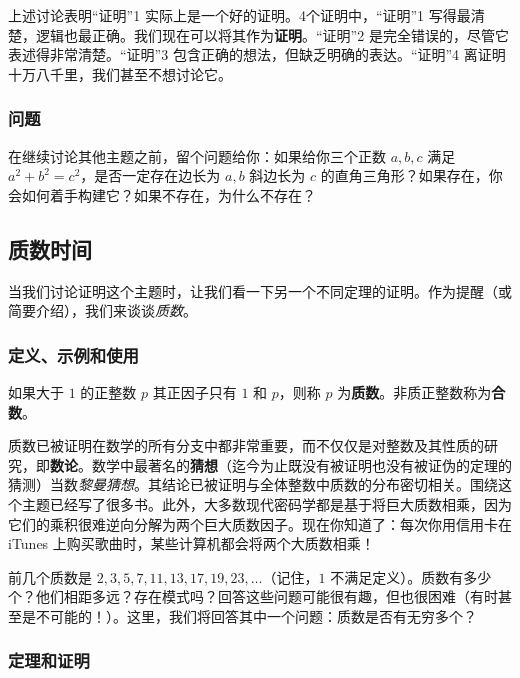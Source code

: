 上述讨论表明“证明”1 实际上是一个好的证明。4个证明中，“证明”1 写得最清楚，逻辑也最正确。我们现在可以将其作为\textbf{证明}。“证明”2 是完全错误的，尽管它表述得非常清楚。“证明”3 包含正确的想法，但缺乏明确的表达。“证明”4 离证明十万八千里，我们甚至不想讨论它。

\subsubsection*{问题}

在继续讨论其他主题之前，留个问题给你：如果给你三个正数 $a,b,c$ 满足 $a^2+b^2=c^2$，是否一定存在边长为 $a,b$ 斜边长为 $c$ 的直角三角形？如果存在，你会如何着手构建它？如果不存在，为什么不存在？

\subsection{质数时间}\label{sec:section1.1.2}

当我们讨论证明这个主题时，让我们看一下另一个不同定理的证明。作为提醒（或简要介绍），我们来谈谈\textit{质数}。

\subsubsection*{定义、示例和使用}

\begin{definition}\label{def:prime}
    如果大于 $1$ 的正整数 $p$ 其正因子只有 $1$ 和 $p$，则称 $p$ 为\textbf{质数}。非质正整数称为\textbf{合数}。
\end{definition}

质数已被证明在数学的所有分支中都非常重要，而不仅仅是对整数及其性质的研究，即\textbf{数论}。数学中最著名的\textbf{猜想}（迄今为止既没有被证明也没有被证伪的定理的猜测）当数\textit{黎曼猜想}。其结论已被证明与全体整数中质数的分布密切相关。围绕这个主题已经写了很多书。此外，大多数现代密码学都是基于将巨大质数相乘，因为它们的乘积很难逆向分解为两个巨大质数因子。现在你知道了：每次你用信用卡在 iTunes 上购买歌曲时，某些计算机都会将两个大质数相乘！

前几个质数是 $2, 3, 5, 7, 11, 13, 17, 19, 23,\dots$（记住，$1$ 不满足定义）。质数有多少个？他们相距多远？存在模式吗？回答这些问题可能很有趣，但也很困难（有时甚至是不可能的！）。这里，我们将回答其中一个问题：质数是否有无穷多个？

\subsubsection*{定理和证明}

